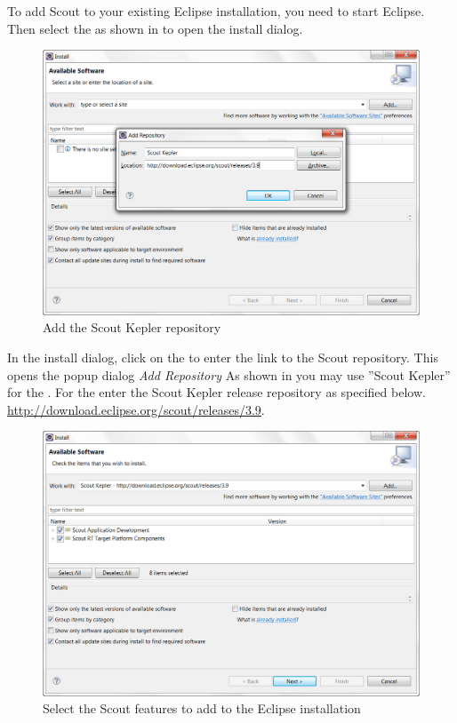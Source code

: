 \documentclass[a4paper,10pt,twoside]{book}
\begin{document}
To add Scout to your existing Eclipse installation, you need to start Eclipse.
Then select the  as shown in  to open the install dialog.

\begin{figure}
\includegraphics[width=13cm]{eclipse_add_repository.png}
\caption{Add the Scout Kepler repository}
\end{figure}

In the install dialog, click on the  to enter the link to the Scout repository.
This opens the popup dialog \textit{Add Repository}
As shown in  you may use ''Scout Kepler'' for the .
For the  enter the Scout Kepler release repository as specified below.
\url{http://download.eclipse.org/scout/releases/3.9}.

\begin{figure}
\includegraphics[width=13cm]{eclipse_select_scout_features.png}
\caption{Select the Scout features to add to the Eclipse installation}
\end{figure}
\end{document}
